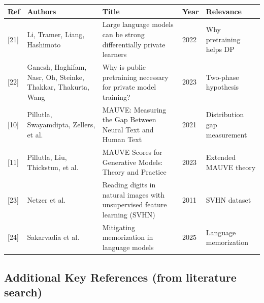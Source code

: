 \documentclass[11pt,a4paper]{article}
\begin{document}
\begin{small}
\begin{longtable}{@{}p{0.6cm}p{3.5cm}p{5.5cm}p{0.7cm}p{2.5cm}@{}}
\toprule
\textbf{Ref} & \textbf{Authors} & \textbf{Title} & \textbf{Year} & \textbf{Relevance} \\
\midrule
\endhead
{[21]} & Li, Tramer, Liang, Hashimoto & Large language models can be strong differentially private learners & 2022 & Why pretraining helps DP \\
{[22]} & Ganesh, Haghifam, Nasr, Oh, Steinke, Thakkar, Thakurta, Wang & Why is public pretraining necessary for private model training? & 2023 & Two-phase hypothesis \\
{[10]} & Pillutla, Swayamdipta, Zellers, et al. & MAUVE: Measuring the Gap Between Neural Text and Human Text & 2021 & Distribution gap measurement \\
{[11]} & Pillutla, Liu, Thickstun, et al. & MAUVE Scores for Generative Models: Theory and Practice & 2023 & Extended MAUVE theory \\
{[23]} & Netzer et al. & Reading digits in natural images with unsupervised feature learning (SVHN) & 2011 & SVHN dataset \\
{[24]} & Sakarvadia et al. & Mitigating memorization in language models & 2025 & Language memorization \\
\bottomrule
\end{longtable}
\end{small}

\subsection{Additional Key References (from literature search)}
\end{document}
